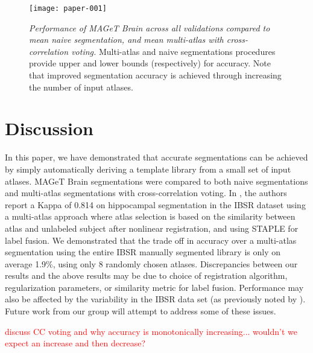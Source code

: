 \documentclass{article}
\newcommand{\todo}[1]{
    \textcolor{red}{#1}
}
\begin{document}
\begin{figure}
\begin{minipage}[b]{1.0\linewidth}
  \centering
\texttt{[image: paper-001]}
\end{minipage}
\caption{{\em Performance of MAGeT Brain across all validations compared to
mean naive segmentation, and mean multi-atlas with cross-correlation voting.}
Multi-atlas and naive segmentations procedures provide upper and lower bounds
(respectively) for accuracy.  Note that improved segmentation accuracy is
achieved through increasing the number of input atlases.}
\label{results}
\end{figure}

\section{Discussion}

In this paper, we have demonstrated that accurate segmentations can be
achieved by simply automatically deriving a template library from a small
set of input atlases.  MAGeT Brain segmentations were compared to both
naive segmentations and multi-atlas segmentations with cross-correlation
voting.  In \cite{Lotjonen2010}, the authors report a Kappa of 0.814 on
hippocampal segmentation in the IBSR dataset using a multi-atlas approach
where atlas selection is based on the similarity between atlas and
unlabeled subject after nonlinear registration, and using STAPLE
\cite{Warfield2004} for label fusion.  We demonstrated that the trade off
in accuracy over a multi-atlas segmentation using the entire IBSR manually
segmented library is only on average 1.9\%, using only 8 randomly chosen
atlases.  Discrepancies between our results and the above results may be
due to choice of registration algorithm, regularization parameters, or
similarity metric for label fusion.  Performance may also be affected by
the variability in the IBSR data set (as previously noted by
\cite{Klein2009}).  Future work from our group will attempt to address some
of these issues.

\todo{discuss CC voting and why accuracy is monotonically increasing...
wouldn't we expect an increase and then decrease?}



\end{document}
